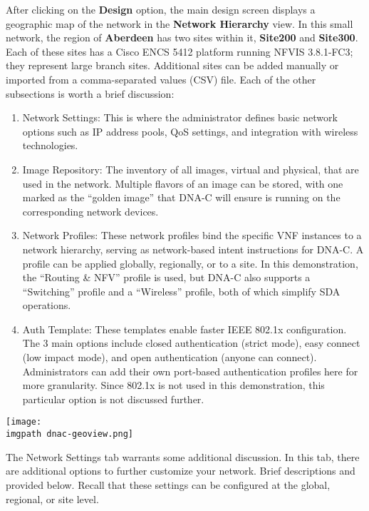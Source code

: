 After clicking on the \textbf{Design} option, the main design screen displays
a geographic map of the network in the \textbf{Network Hierarchy} view. In
this small network, the region of \textbf{Aberdeen} has two sites within it,
\textbf{Site200} and \textbf{Site300}. Each of these sites has a Cisco ENCS
5412 platform running NFVIS 3.8.1-FC3; they represent large branch sites.
Additional sites can be added manually or imported from a comma-separated
values (CSV) file. Each of the other subsections is worth a brief discussion:

\begin{enumerate}
  \item Network Settings: This is where the administrator defines basic
  network options such as IP address pools, QoS settings, and integration with
  wireless technologies.
  \item Image Repository: The inventory of all images, virtual and physical,
  that are used in the network. Multiple flavors of an image can be stored, with
  one marked as the ``golden image'' that DNA-C will ensure is running on the
  corresponding network devices.
  \item Network Profiles: These network profiles bind the specific VNF
  instances to a network hierarchy, serving as network-based intent instructions
  for DNA-C. A profile can be applied globally, regionally, or to a site. In
  this demonstration, the ``Routing \& NFV'' profile is used, but DNA-C also
  supports a ``Switching'' profile and a ``Wireless'' profile, both of which
  simplify SDA operations.
  \item Auth Template: These templates enable faster IEEE 802.1x
  configuration. The 3 main options include closed authentication (strict mode),
  easy connect (low impact mode), and open authentication (anyone can connect).
  Administrators can add their own port-based authentication profiles here for
  more granularity. Since 802.1x is not used in this demonstration, this
  particular option is not discussed further.
\end{enumerate}

    \begin{minipage}[t]{\linewidth}
	  \centering
      \texttt{[image: \\imgpath dnac-geoview.png]}
    \end{minipage}

The Network Settings tab warrants some additional discussion. In this tab,
there are additional options to further customize your network. Brief
descriptions and provided below. Recall that these settings can be configured
at the global, regional, or site level.


